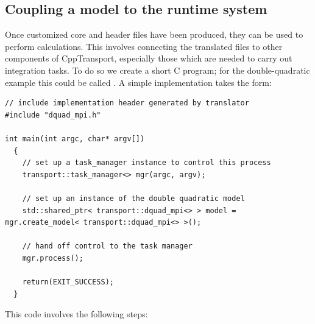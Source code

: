 \documentclass[11pt,a4paper]{article}
\renewcommand{\texttt}[1]{{\ttfamily\fontseries{l}\selectfont{#1}}}
\newcommand{\packagefont}{\sffamily}
\newcommand{\CppTransport}{{\packagefont CppTransport}}
\newcommand{\file}[1]{\texttt{{#1}}}
\newcommand\CC{C\nolinebreak\hspace{-.05em}\raisebox{.4ex}{\relsize{-3}{\textbf{+}}}\nolinebreak\hspace{-.10em}\raisebox{.4ex}{\relsize{-3}{\textbf{+}}}}
\begin{document}
\subsection{Coupling a model to the runtime system}
Once customized core and header files
have been produced, they can be used to perform
calculations. This involves
connecting the translated
files to other components of
{\CppTransport},
especially those which are needed to carry out integration tasks.
To do so we create a short {\CC} program;
for the double-quadratic example this could be called
\file{dquad.cpp}.
A simple implementation takes the form:
\begin{verbatim}
// include implementation header generated by translator
#include "dquad_mpi.h"

int main(int argc, char* argv[])
  {
    // set up a task_manager instance to control this process
    transport::task_manager<> mgr(argc, argv);

    // set up an instance of the double quadratic model
    std::shared_ptr< transport::dquad_mpi<> > model = mgr.create_model< transport::dquad_mpi<> >();

    // hand off control to the task manager
    mgr.process();

    return(EXIT_SUCCESS);
  }
\end{verbatim}
This code involves the following steps:
\end{document}
